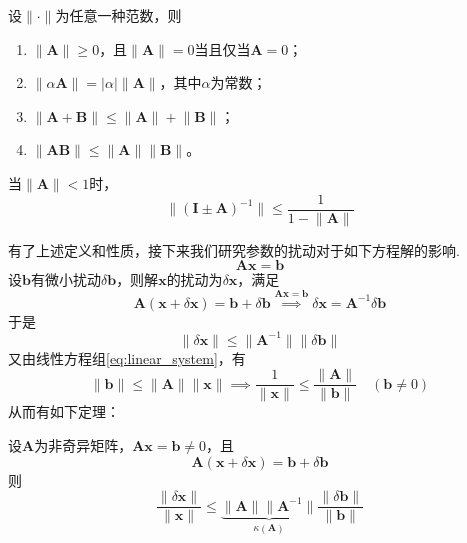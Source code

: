 \begin{property}[范数运算法则]
    设$\lVert\cdot\rVert$为任意一种范数，则
    \begin{enumerate}[label=\roman*)]
        \item $\lVert \boldsymbol{A}\rVert\geqslant 0$，且$\lVert \boldsymbol{A}\rVert=0$当且仅当$\boldsymbol{A}=0$；
        \item $\lVert \alpha \boldsymbol{A}\rVert=\lvert\alpha\rvert\lVert \boldsymbol{A}\rVert$，其中$\alpha$为常数；
        \item $\lVert \boldsymbol{A}+\boldsymbol{B}\rVert\leqslant \lVert \boldsymbol{A}\rVert+\lVert \boldsymbol{B}\rVert$；
        \item $\lVert \boldsymbol{A}\boldsymbol{B}\rVert\leqslant \lVert \boldsymbol{A}\rVert\lVert \boldsymbol{B}\rVert$。
    \end{enumerate}
\end{property}

\begin{theorem}\label{norm_approximation_of_inverse}
    当$\lVert \boldsymbol{A}\rVert<1$时，
    \[
        \lVert (\boldsymbol{I}\pm \boldsymbol{A})^{-1}\rVert \leqslant \frac{1}{1-\lVert \boldsymbol{A}\rVert}
    \]
\end{theorem}


有了上述定义和性质，接下来我们研究参数的扰动对于如下方程解的影响.
\begin{equation}\label{eq:linear_system}
    \boldsymbol{A}\boldsymbol{x}=\boldsymbol{b}
\end{equation}
设$\boldsymbol{b}$有微小扰动$\delta \boldsymbol{b}$，则解$\boldsymbol{x}$的扰动为$\delta \boldsymbol{x}$，满足
\[
    \boldsymbol{A}(\boldsymbol{x}+\delta \boldsymbol{x})=\boldsymbol{b}+\delta \boldsymbol{b}\overset{\boldsymbol{A}\boldsymbol{x}=\boldsymbol{b}}{\implies} \delta \boldsymbol{x}=\boldsymbol{A}^{-1}\delta \boldsymbol{b}
\]
于是
\[
    \lVert \delta \boldsymbol{x}\rVert\leqslant \lVert \boldsymbol{A}^{-1}\rVert\lVert\delta \boldsymbol{b}\rVert
\]
又由线性方程组\ref{eq:linear_system}，有
\[
    \lVert \boldsymbol{b}\rVert\leqslant \lVert \boldsymbol{A}\rVert\lVert \boldsymbol{x}\rVert\implies \frac{1}{\lVert \boldsymbol{x}\rVert}\leqslant \frac{\lVert \boldsymbol{A}\rVert}{\lVert \boldsymbol{b}\rVert}\quad (\boldsymbol{b}\ne 0)
\]
从而有如下定理：
\begin{theorem}
    设$\boldsymbol{A}$为非奇异矩阵，$\boldsymbol{A}\boldsymbol{x}=\boldsymbol{b}\ne 0$，且
    \[
        \boldsymbol{A}(\boldsymbol{x}+\delta \boldsymbol{x})=\boldsymbol{b}+\delta \boldsymbol{b}
    \]
    则
    \[
        \frac{\lVert \delta \boldsymbol{x}\rVert}{\lVert \boldsymbol{x}\rVert}\leqslant \underbrace{\lVert \boldsymbol{A} \rVert\lVert \boldsymbol{A}^{-1}\rVert}_{\kappa(\boldsymbol{A})}\frac{\lVert \delta \boldsymbol{b}\rVert}{\lVert \boldsymbol{b}\rVert}
    \]
\end{theorem}


